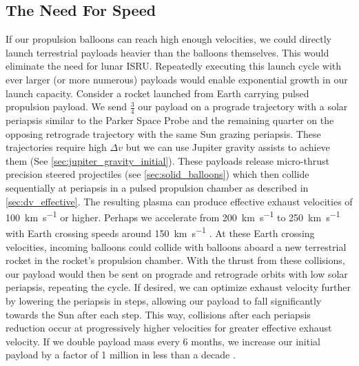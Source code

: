 \documentclass{article}
\begin{document}
{\subsection{The Need For Speed}\label{sec:no_isru_rocket}
If our propulsion balloons can reach high enough velocities, we could directly launch terrestrial payloads heavier than the balloons themselves.   This would eliminate the need for lunar ISRU. Repeatedly executing this launch cycle with ever larger (or more numerous) payloads would enable exponential growth in our launch capacity. Consider a rocket launched from Earth carrying pulsed propulsion payload.   We send $\frac{3}{4}$ our payload on a prograde trajectory with a solar periapsis similar to the Parker Space Probe and the remaining quarter on the opposing retrograde trajectory with the same Sun grazing periapsis.  These trajectories require high $\Delta v$ but we can use Jupiter gravity assists to achieve them (See \autoref{sec:jupiter_gravity_initial}).   These payloads release micro-thrust precision steered projectiles (see \autoref{sec:solid_balloons}) which then collide sequentially at periapsis in a pulsed propulsion chamber as described in \autoref{sec:dv_effective}. The resulting plasma can produce effective exhaust velocities of \SI{100}{\kilo\meter\per\second} or higher. Perhaps we accelerate from \SI{200}{\kilo\meter\per\second} to \SI{250}{\kilo\meter\per\second} with Earth crossing speeds around \SI{150}{\kilo\meter\per\second} \cite{github_repo_for_paper}.  At these Earth crossing velocities, incoming balloons could collide with balloons aboard a new terrestrial rocket in the rocket's propulsion chamber.  With the thrust from these collisions, our payload would then be sent on prograde and retrograde orbits with low solar periapsis, repeating the cycle.  If desired, we can optimize exhaust velocity further by lowering the periapsis in steps, allowing our payload to fall significantly towards the Sun after each step.  This way, collisions after each periapsis reduction occur at progressively higher velocities for greater effective exhaust velocity.   If we double payload mass every 6 months, we increase our initial payload by a factor of 1 million in less than a decade \cite{github_repo_for_paper}. 

}
\end{document}
